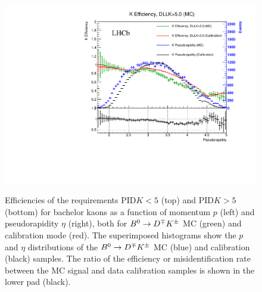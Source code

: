 \begin{figure}[t]
\begin{center}
		\includegraphics[width=0.495\linewidth]{AA-Appdx-pid/figs/Bd2DK_BacK_DLLKgt5_PIDeff_beforeResampling_ETA.pdf} \\
	\end{center}
        \vspace{-2mm}
	\caption{Efficiencies of the requirements PID$K<5$ (top) and PID$K>5$ (bottom) for bachelor kaons as a function of momentum $p$
	(left) and pseudorapidity $\eta$ (right), both for $B^0\rightarrow D^\mp K^\pm$ MC (green) and calibration mode (red).
	 The superimposed histograms show the $p$ and $\eta$ distributions of the $B^0\rightarrow D^\mp K^\pm$ MC (blue) and calibration (black) samples.
	The ratio of the
	efficiency or misidentification rate between the MC signal and data calibration
	samples is shown in the lower pad (black).}
	\label{fig:PIDKeffKBac}
\end{figure}
